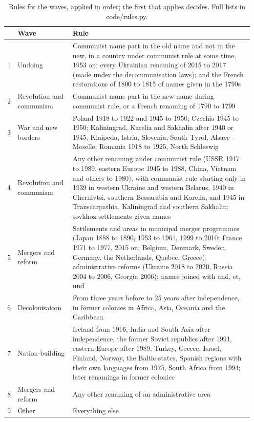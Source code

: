 \documentclass[11pt,a4paper]{article}
\begin{document}
\begin{table}[tbp]\centering\small\caption{Rules for the waves, applied in order; the first that applies decides. Full lists in code/rules.py.}\label{tab:rules}\begin{tabular}{rlp{10.2cm}}\toprule & Wave & Rule\\\midrule
1 & Undoing & Communist name part in the old name and not in the new, in a country under communist rule at some time, 1953 on; every Ukrainian renaming of 2015 to 2017 (made under the decommunisation laws); and the French restorations of 1800 to 1815 of names given in the 1790s\\
2 & Revolution and communism & Communist name part in the new name during communist rule, or a French renaming of 1790 to 1799\\
3 & War and new borders & Poland 1918 to 1922 and 1945 to 1950; Czechia 1945 to 1950; Kaliningrad, Karelia and Sakhalin after 1940 or 1945; Klaipeda, Istria, Slovenia, South Tyrol, Alsace-Moselle, Romania 1918 to 1925, North Schleswig\\
4 & Revolution and communism & Any other renaming under communist rule (USSR 1917 to 1989, eastern Europe 1945 to 1988, China, Vietnam and others to 1980), with communist rule starting only in 1939 in western Ukraine and western Belarus, 1940 in Chernivtsi, southern Bessarabia and Karelia, and 1945 in Transcarpathia, Kaliningrad and southern Sakhalin; sovkhoz settlements given names\\
5 & Mergers and reform & Settlements and areas in municipal merger programmes (Japan 1888 to 1890, 1953 to 1961, 1999 to 2010; France 1971 to 1977, 2015 on; Belgium, Denmark, Sweden, Germany, the Netherlands, Quebec, Greece); administrative reforms (Ukraine 2018 to 2020, Russia 2004 to 2006, Georgia 2006); names joined with and, et, und\\
6 & Decolonisation & From three years before to 25 years after independence, in former colonies in Africa, Asia, Oceania and the Caribbean\\
7 & Nation-building & Ireland from 1916, India and South Asia after independence, the former Soviet republics after 1991, eastern Europe after 1989, Turkey, Greece, Israel, Finland, Norway, the Baltic states, Spanish regions with their own languages from 1975, South Africa from 1994; later renamings in former colonies\\
8 & Mergers and reform & Any other renaming of an administrative area\\
9 & Other & Everything else\\
\bottomrule\end{tabular}\end{table}
\end{document}
